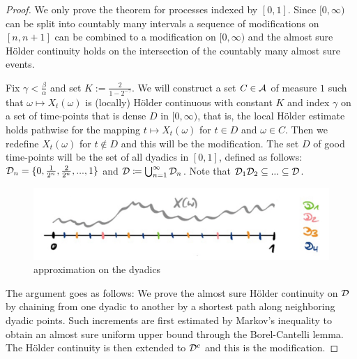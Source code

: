 \begin{proof}[Proof]
	We only prove the theorem for processes indexed by $[0,1]$. Since $[0,\infty)$ can be split into countably many intervals a sequence of modifications on $[n,n+1]$ can be combined to a modification on $[0,\infty)$ and the almost sure H\"older continuity holds on the intersection of the countably many almost sure events.\smallskip

	Fix $\gamma<\frac{\beta}{\alpha}$ and set $K := \frac{2}{1-2^{-\gamma}}$. We will construct a set $C\in \mathcal{A}$ of measure $1$ such that $\omega \mapsto X_t(\omega)$ is (locally) H\"older continuous with constant $K$ and index $\gamma$ on a set of time-points that is dense $D$ in $[0,\infty)$, that is, the local H\"older estimate holds pathwise for the mapping $t\mapsto X_t(\omega)$ for $t\in D$ and $\omega \in C$. Then we redefine $X_t(\omega)$ for $t\notin D$ and this will be the modification. The set $D$ of good time-points will be the set of all dyadics in $[0,1]$, defined as follows: $\mathcal{D}_n = \{ 0, \frac{1}{2^n},\frac{2}{2^n},...,1\}$ and $\mathcal{D} \coloneqq \bigcup_{n=1}^{\infty} \mathcal{D}_n$. Note that $\mathcal D_1\mathcal{D}_2\subseteq ... \subseteq \mathcal{D}$.
	\begin{figure}[h]
		\begin{center}
			\includegraphics[scale=0.07]{dyadic1.jpeg}
			\caption*{approximation on the dyadics}
		\end{center}
		\end{figure}
	The argument goes as follows: We prove the almost sure H\"older continuity on $\mathcal{D}$ by chaining from one dyadic to another by a shortest path along neighboring dyadic points. Such increments are first estimated by Markov's inequality to obtain an almost sure uniform upper bound through the Borel-Cantelli lemma. The H\"older continuity is then extended to $\mathcal{D}^c$ and this is the modification.\smallskip


\end{proof}

